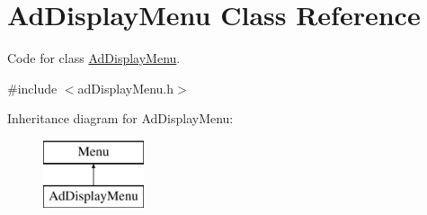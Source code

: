 \hypertarget{class_ad_display_menu}{}\section{Ad\+Display\+Menu Class Reference}
\label{class_ad_display_menu}


Code for class \hyperlink{class_ad_display_menu}{Ad\+Display\+Menu}.  




{\ttfamily \#include $<$ad\+Display\+Menu.\+h$>$}

Inheritance diagram for Ad\+Display\+Menu\+:\begin{figure}[H]
\begin{center}
\leavevmode
\includegraphics[height=2.000000cm]{class_ad_display_menu}
\end{center}
\end{figure}
